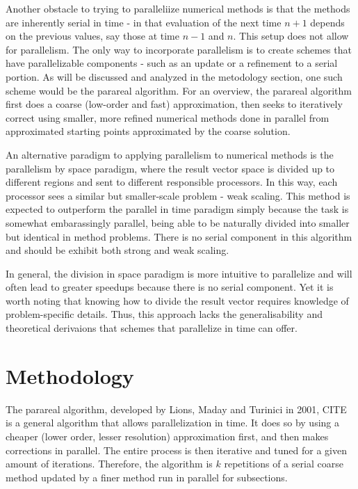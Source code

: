 \documentclass[letterpaper,11pt]{article}
\begin{document}
Another obstacle to trying to paralleliize numerical methods is that the methods are inherently serial in time - in that evaluation of the next time $n+1$ depends on the previous values, say those at time $n-1$ and $n$.  This setup does not allow for parallelism.  The only way to incorporate parallelism is to create schemes that have parallelizable components - such as an update or a refinement to a serial portion.  As will be discussed and analyzed in the metodology section, one such scheme would be the parareal algorithm.  For an overview, the parareal algorithm first does a coarse (low-order and fast) approximation, then seeks to iteratively correct using smaller, more refined numerical methods done in parallel from approximated starting points approximated by the coarse solution.

An alternative paradigm to applying parallelism to numerical methods is the parallelism by space paradigm, where the result vector space is divided up to different regions and sent to different responsible processors.  In this way, each processor sees a similar but smaller-scale problem - weak scaling.  This method is expected to outperform the parallel in time paradigm simply because the task is somewhat embarassingly parallel, being able to be naturally divided into smaller but identical in method problems.  There is no serial component in this algorithm and should be exhibit both strong and weak scaling.

In general, the division in space paradigm is more intuitive to parallelize and will often lead to greater speedups because there is no serial component.  Yet it is worth noting that knowing how to divide the result vector requires knowledge of problem-specific details.  Thus, this approach lacks the generalisability and theoretical derivaions that schemes that parallelize in time can offer.

\section{Methodology}

The parareal algorithm, developed by Lions, Maday and Turinici in 2001, CITE is
a general algorithm that allows parallelization in time.  It does so by using a
cheaper (lower order, lesser resolution) approximation first, and then makes
corrections in parallel. The entire process is then iterative and tuned for a
given amount of iterations. Therefore, the algorithm is $k$ repetitions of a
serial coarse method updated by a finer method run in parallel for subsections.
\end{document}
